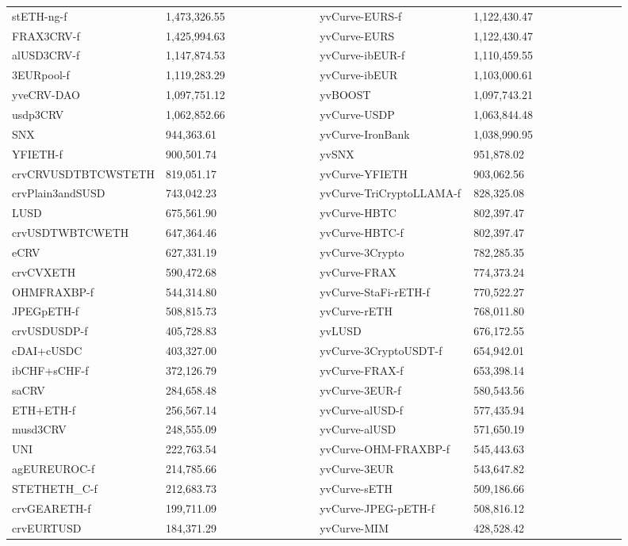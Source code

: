 \begin{longtable}{@{}p{0.25\linewidth}p{0.25\linewidth}p{0.25\linewidth}p{0.25\linewidth}@{}}
stETH-ng-f & 1,473,326.55 & yvCurve-EURS-f & 1,122,430.47 \\
FRAX3CRV-f & 1,425,994.63 & yvCurve-EURS & 1,122,430.47 \\
alUSD3CRV-f & 1,147,874.53 & yvCurve-ibEUR-f & 1,110,459.55 \\
3EURpool-f & 1,119,283.29 & yvCurve-ibEUR & 1,103,000.61 \\
yveCRV-DAO & 1,097,751.12 & yvBOOST & 1,097,743.21 \\
usdp3CRV & 1,062,852.66 & yvCurve-USDP & 1,063,844.48 \\
SNX & 944,363.61 & yvCurve-IronBank & 1,038,990.95 \\
YFIETH-f & 900,501.74 & yvSNX & 951,878.02 \\
crvCRVUSDTBTCWSTETH & 819,051.17 & yvCurve-YFIETH & 903,062.56 \\
crvPlain3andSUSD & 743,042.23 & yvCurve-TriCryptoLLAMA-f & 828,325.08 \\
LUSD & 675,561.90 & yvCurve-HBTC & 802,397.47 \\
crvUSDTWBTCWETH & 647,364.46 & yvCurve-HBTC-f & 802,397.47 \\
eCRV & 627,331.19 & yvCurve-3Crypto & 782,285.35 \\
crvCVXETH & 590,472.68 & yvCurve-FRAX & 774,373.24 \\
OHMFRAXBP-f & 544,314.80 & yvCurve-StaFi-rETH-f & 770,522.27 \\
JPEGpETH-f & 508,815.73 & yvCurve-rETH & 768,011.80 \\
crvUSDUSDP-f & 405,728.83 & yvLUSD & 676,172.55 \\
cDAI+cUSDC & 403,327.00 & yvCurve-3CryptoUSDT-f & 654,942.01 \\
ibCHF+sCHF-f & 372,126.79 & yvCurve-FRAX-f & 653,398.14 \\
saCRV & 284,658.48 & yvCurve-3EUR-f & 580,543.56 \\
ETH+ETH-f & 256,567.14 & yvCurve-alUSD-f & 577,435.94 \\
musd3CRV & 248,555.09 & yvCurve-alUSD & 571,650.19 \\
UNI & 222,763.54 & yvCurve-OHM-FRAXBP-f & 545,443.63 \\
agEUREUROC-f & 214,785.66 & yvCurve-3EUR & 543,647.82 \\
STETHETH_C-f & 212,683.73 & yvCurve-sETH & 509,186.66 \\
crvGEARETH-f & 199,711.09 & yvCurve-JPEG-pETH-f & 508,816.12 \\
crvEURTUSD & 184,371.29 & yvCurve-MIM & 428,528.42 \\

\end{longtable}
